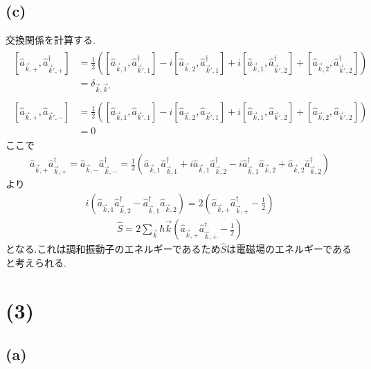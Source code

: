 \documentclass[uplatex,a4j,11pt,dvipdfmx]{jsarticle}
\begin{document}
\subsection*{(c)}
交換関係を計算する.
\begin{align}
  \begin{split}
    [\hat{a}_{\vec{k},+},\hat{a}_{\vec{k}',+}^\dagger]&=\frac{1}{2}\left([\hat{a}_{\vec{k},1},\hat{a}_{\vec{k}',1}^\dagger]-i[\hat{a}_{\vec{k},2},\hat{a}_{\vec{k}',1}^\dagger]+i[\hat{a}_{\vec{k},1},\hat{a}_{\vec{k}',2}^\dagger]+[\hat{a}_{\vec{k},2},\hat{a}_{\vec{k}',2}^\dagger]\right)\\
    &=\delta_{\vec{k},\vec{k}'}
  \end{split}
\end{align}
\begin{align}
  \begin{split}
    [\hat{a}_{\vec{k},+},\hat{a}_{\vec{k}',-}]&=\frac{1}{2}\left([\hat{a}_{\vec{k},1},\hat{a}_{\vec{k}',1}]-i[\hat{a}_{\vec{k},2},\hat{a}_{\vec{k}',1}]+i[\hat{a}_{\vec{k},1},\hat{a}_{\vec{k}',2}]+[\hat{a}_{\vec{k},2},\hat{a}_{\vec{k}',2}]\right)\\
    &=0
  \end{split}
\end{align}
ここで
\begin{align*}
  \hat{a}_{\vec{k},+}\hat{a}_{\vec{k},+}^\dagger=\hat{a}_{\vec{k},-}\hat{a}_{\vec{k},-}^\dagger=\frac{1}{2}\left(\hat{a}_{\vec{k},1}\hat{a}_{\vec{k},1}^\dagger+i\hat{a}_{\vec{k},1}\hat{a}_{\vec{k},2}^\dagger-i\hat{a}_{\vec{k},1}^\dagger\hat{a}_{\vec{k},2}+\hat{a}_{\vec{k},2}\hat{a}_{\vec{k},2}^\dagger\right)
\end{align*}
より
\begin{align*}
  i\left(\hat{a}_{\vec{k},1}\hat{a}_{\vec{k},2}^\dagger-\hat{a}_{\vec{k},1}^\dagger\hat{a}_{\vec{k},2}\right)=2\left(\hat{a}_{\vec{k},+}\hat{a}_{\vec{k},+}^\dagger-\frac{1}{2}\right)
\end{align*}
\begin{align}
  \hat{S}=2\sum_{\vec{k}}\hbar\vec{k}\left(\hat{a}_{\vec{k},+}\hat{a}_{\vec{k},+}^\dagger-\frac{1}{2}\right)
\end{align}
となる.これは調和振動子のエネルギーであるため$\hat{S}$は電磁場のエネルギーであると考えられる.
\section*{(3)}
\subsection*{(a)}
\end{document}
